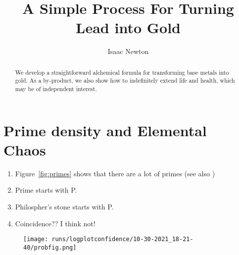 \documentclass{article}
\title{A Simple Process For Turning Lead into Gold}
\author{Isaac Newton}
\date{}
\begin{document}
\maketitle
\begin{abstract}
We develop a straightforward alchemical formula for transforming base metals into gold. 
As a by-product, we also show how to indefinitely extend life and health, which may be of independent interest.
\end{abstract}


\section{Prime density and Elemental Chaos}
\begin{enumerate}
\item Figure~\ref{fig:primes} shows that there are a lot of primes (see also \cite{newman1980simple})
\item Prime starts with P.
\item Philospher's stone starts with P.
\item Coincidence?? I think not!
\end{enumerate}
\begin{figure}
\centering
\texttt{[image: runs/logplotconfidence/10-30-2021\_18-21-40/probfig.png]}
\end{figure}\label{fig:primes}

\printbibliography
\end{document}
